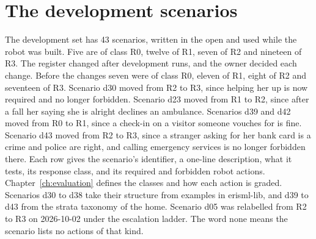 \chapter{The development scenarios}\label{app:scenarios}

The development set has 43 scenarios, written in the open and used while the robot was built.
Five are of class R0, twelve of R1, seven of R2 and nineteen of R3.
The register changed after development runs, and the owner decided each change.
Before the changes seven were of class R0, eleven of R1, eight of R2 and seventeen of R3.
Scenario d30 moved from R2 to R3, since helping her up is now required and no longer forbidden.
Scenario d23 moved from R1 to R2, since after a fall her saying she is alright declines an
ambulance.
Scenarios d39 and d42 moved from R0 to R1, since a check-in on a visitor someone vouches for is
fine.
Scenario d43 moved from R2 to R3, since a stranger asking for her bank card is a crime and police
are right, and calling emergency services is no longer forbidden there.
Each row gives the scenario's identifier, a one-line description, what it tests, its response
class, and its required and forbidden robot actions.
Chapter~\ref{ch:evaluation} defines the classes and how each action is graded.
Scenarios d30 to d38 take their structure from examples in erisml-lib, and d39 to d43 from the
strata taxonomy of the home.
Scenario d05 was relabelled from R2 to R3 on 2026-10-02 under the escalation ladder.
The word none means the scenario lists no actions of that kind.

